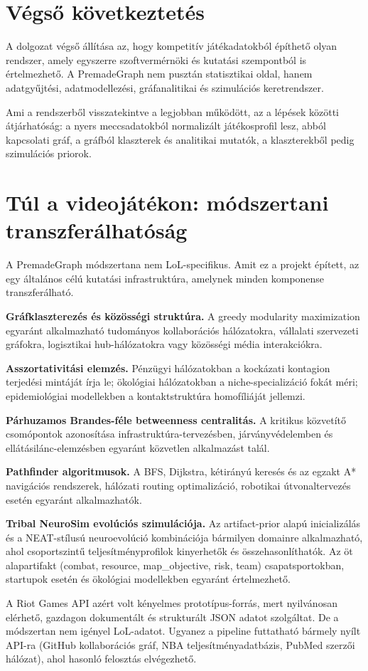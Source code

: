 \section{Végső következtetés}

A dolgozat végső állítása az, hogy kompetitív játékadatokból építhető olyan rendszer, amely egyszerre szoftvermérnöki és kutatási szempontból is értelmezhető. A PremadeGraph nem pusztán statisztikai oldal, hanem adatgyűjtési, adatmodellezési, gráfanalitikai és szimulációs keretrendszer.

Ami a rendszerből visszatekintve a legjobban működött, az a lépések közötti átjárhatóság: a nyers meccsadatokból normalizált játékosprofil lesz, abból kapcsolati gráf, a gráfból klaszterek és analitikai mutatók, a klaszterekből pedig szimulációs priorok.

\section{Túl a videojátékon: módszertani transzferálhatóság}
\label{sec:osszegzes-transfer}

A PremadeGraph módszertana nem LoL-specifikus. Amit ez a projekt épített, az egy általános célú kutatási infrastruktúra, amelynek minden komponense transzferálható.

\textbf{Gráfklaszterezés és közösségi struktúra.} A greedy modularity maximization egyaránt alkalmazható tudományos kollaborációs hálózatokra, vállalati szervezeti gráfokra, logisztikai hub-hálózatokra vagy közösségi média interakciókra.

\textbf{Asszortativitási elemzés.} Pénzügyi hálózatokban a kockázati kontagion terjedési mintáját írja le; ökológiai hálózatokban a niche-specializáció fokát méri; epidemiológiai modellekben a kontaktstruktúra homofíliáját jellemzi.

\textbf{Párhuzamos Brandes-féle betweenness centralitás.} A kritikus közvetítő csomópontok azonosítása infrastruktúra-tervezésben, járványvédelemben és ellátásilánc-elemzésben egyaránt közvetlen alkalmazást talál.

\textbf{Pathfinder algoritmusok.} A BFS, Dijkstra, kétirányú keresés és az egzakt A* navigációs rendszerek, hálózati routing optimalizáció, robotikai útvonaltervezés esetén egyaránt alkalmazhatók.

\textbf{Tribal NeuroSim evolúciós szimulációja.} Az artifact-prior alapú inicializálás és a NEAT-stílusú neuroevolúció kombinációja bármilyen domainre alkalmazható, ahol csoportszintű teljesítményprofilok kinyerhetők és összehasonlíthatók. Az öt alapartifakt (combat, resource, map\_objective, risk, team) csapatsportokban, startupok esetén és ökológiai modellekben egyaránt értelmezhető.

A Riot Games API azért volt kényelmes prototípus-forrás, mert nyilvánosan elérhető, gazdagon dokumentált és strukturált JSON adatot szolgáltat. De a módszertan nem igényel LoL-adatot. Ugyanez a pipeline futtatható bármely nyílt API-ra (GitHub kollaborációs gráf, NBA teljesítményadatbázis, PubMed szerzői hálózat), ahol hasonló felosztás elvégezhető.




